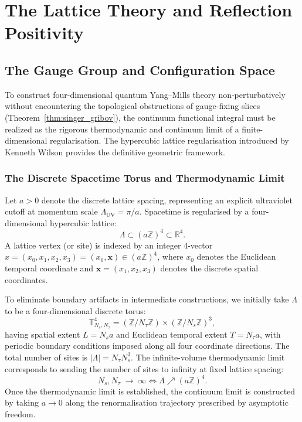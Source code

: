 \chapter{The Lattice Theory and Reflection Positivity}
\label{ch:lattice}
\label{ch:lattice_reflection_positivity}

\section{The Gauge Group and Configuration Space}
\label{sec:lattice_config}

To construct four-dimensional quantum Yang--Mills theory non-perturbatively without encountering the topological obstructions of gauge-fixing slices (Theorem~\ref{thm:singer_gribov}), the continuum functional integral must be realized as the rigorous thermodynamic and continuum limit of a finite-dimensional regularisation. The hypercubic lattice regularisation introduced by Kenneth Wilson \cite{Wilson1974} provides the definitive geometric framework.

\subsection{The Discrete Spacetime Torus and Thermodynamic Limit}
\label{subsec:lattice_torus}
Let $a > 0$ denote the discrete lattice spacing, representing an explicit ultraviolet cutoff at momentum scale $\Lambda_{\mathrm{UV}} = \pi / a$. Spacetime is regularised by a four-dimensional hypercubic lattice:
\begin{equation}
\Lambda \subset (a \mathbb{Z})^4 \subset \mathbb{R}^4.
\end{equation}
A lattice vertex (or site) is indexed by an integer 4-vector $x = (x_0, x_1, x_2, x_3) = (x_0, \mathbf{x}) \in (a \mathbb{Z})^4$, where $x_0$ denotes the Euclidean temporal coordinate and $\mathbf{x} = (x_1, x_2, x_3)$ denotes the discrete spatial coordinates.

To eliminate boundary artifacts in intermediate constructions, we initially take $\Lambda$ to be a four-dimensional discrete torus:
\begin{equation}
\mathbb{T}_{N_s, N_\tau}^4 = (\mathbb{Z} / N_\tau \mathbb{Z}) \times (\mathbb{Z} / N_s \mathbb{Z})^3,
\end{equation}
having spatial extent $L = N_s a$ and Euclidean temporal extent $T = N_\tau a$, with periodic boundary conditions imposed along all four coordinate directions. The total number of sites is $|\Lambda| = N_\tau N_s^3$. The infinite-volume thermodynamic limit corresponds to sending the number of sites to infinity at fixed lattice spacing:
\begin{equation}
N_s, N_\tau \;\longrightarrow\; \infty \iff \Lambda \nearrow (a \mathbb{Z})^4.
\end{equation}
Once the thermodynamic limit is established, the continuum limit is constructed by taking $a \to 0$ along the renormalisation trajectory prescribed by asymptotic freedom.

